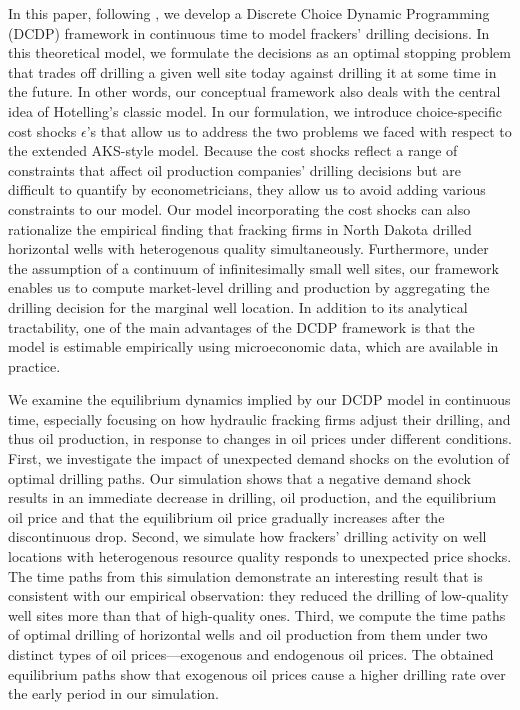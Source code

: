 In this paper, following \cite{Estimation-of-Dynamic-Discrete-Choice-Models-in-Continuous-Time_ABBE_2016}, we develop a Discrete Choice Dynamic Programming (DCDP) framework in continuous time to model frackers' drilling decisions. In this theoretical model, we formulate the decisions as an optimal stopping problem that trades off drilling a given well site today against drilling it at some time in the future. In other words, our conceptual framework also deals with the central idea of Hotelling's classic model. In our formulation, we introduce choice-specific cost shocks $\epsilon$'s that allow us to address the two problems we faced with respect to the extended AKS-style model. Because the cost shocks reflect a range of constraints that affect oil production companies' drilling decisions but are difficult to quantify by econometricians, they allow us to avoid adding various constraints to our model. Our model incorporating the cost shocks can also rationalize the empirical finding that fracking firms in North Dakota drilled horizontal wells with heterogenous quality simultaneously. Furthermore, under the assumption of a continuum of infinitesimally small well sites, our framework enables us to compute market-level drilling and production by aggregating the drilling decision for the marginal well location. In addition to its analytical tractability, one of the main advantages of the DCDP framework is that the model is estimable empirically using microeconomic data, which are available in practice. 

We examine the equilibrium dynamics implied by our DCDP model in continuous time, especially focusing on how hydraulic fracking firms adjust their drilling, and thus oil production, in response to changes in oil prices under different conditions. First, we investigate the impact of unexpected demand shocks on the evolution of optimal drilling paths. Our simulation shows that a negative demand shock results in an immediate decrease in drilling, oil production, and the equilibrium oil price and that the equilibrium oil price gradually increases after the discontinuous drop. Second, we simulate how frackers' drilling activity on well locations with heterogenous resource quality responds to unexpected price shocks. The time paths from this simulation demonstrate an interesting result that is consistent with our empirical observation: they reduced the drilling of low-quality well sites more than that of high-quality ones. Third, we compute the time paths of optimal drilling of horizontal wells and oil production from them under two distinct types of oil prices---exogenous and endogenous oil prices. The obtained equilibrium paths show that exogenous oil prices cause a higher drilling rate over the early period in our simulation. 

